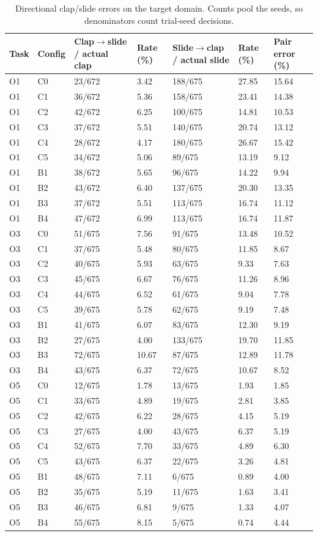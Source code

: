\begin{table}[t]
\centering
\small
\caption{Directional clap/slide errors on the target domain. Counts pool the seeds, so denominators count trial-seed decisions.}
\label{tab:T8_clap_slide}
\begin{tabular}{lllllll}
\hline
Task & Config & Clap$\rightarrow$slide / actual clap & Rate (\%) & Slide$\rightarrow$clap / actual slide & Rate (\%)  & Pair error (\%) \\
\hline
O1 & C0 & 23/672 & 3.42 & 188/675 & 27.85 & 15.64 \\
O1 & C1 & 36/672 & 5.36 & 158/675 & 23.41 & 14.38 \\
O1 & C2 & 42/672 & 6.25 & 100/675 & 14.81 & 10.53 \\
O1 & C3 & 37/672 & 5.51 & 140/675 & 20.74 & 13.12 \\
O1 & C4 & 28/672 & 4.17 & 180/675 & 26.67 & 15.42 \\
O1 & C5 & 34/672 & 5.06 & 89/675 & 13.19 & 9.12 \\
O1 & B1 & 38/672 & 5.65 & 96/675 & 14.22 & 9.94 \\
O1 & B2 & 43/672 & 6.40 & 137/675 & 20.30 & 13.35 \\
O1 & B3 & 37/672 & 5.51 & 113/675 & 16.74 & 11.12 \\
O1 & B4 & 47/672 & 6.99 & 113/675 & 16.74 & 11.87 \\
O3 & C0 & 51/675 & 7.56 & 91/675 & 13.48 & 10.52 \\
O3 & C1 & 37/675 & 5.48 & 80/675 & 11.85 & 8.67 \\
O3 & C2 & 40/675 & 5.93 & 63/675 & 9.33 & 7.63 \\
O3 & C3 & 45/675 & 6.67 & 76/675 & 11.26 & 8.96 \\
O3 & C4 & 44/675 & 6.52 & 61/675 & 9.04 & 7.78 \\
O3 & C5 & 39/675 & 5.78 & 62/675 & 9.19 & 7.48 \\
O3 & B1 & 41/675 & 6.07 & 83/675 & 12.30 & 9.19 \\
O3 & B2 & 27/675 & 4.00 & 133/675 & 19.70 & 11.85 \\
O3 & B3 & 72/675 & 10.67 & 87/675 & 12.89 & 11.78 \\
O3 & B4 & 43/675 & 6.37 & 72/675 & 10.67 & 8.52 \\
O5 & C0 & 12/675 & 1.78 & 13/675 & 1.93 & 1.85 \\
O5 & C1 & 33/675 & 4.89 & 19/675 & 2.81 & 3.85 \\
O5 & C2 & 42/675 & 6.22 & 28/675 & 4.15 & 5.19 \\
O5 & C3 & 27/675 & 4.00 & 43/675 & 6.37 & 5.19 \\
O5 & C4 & 52/675 & 7.70 & 33/675 & 4.89 & 6.30 \\
O5 & C5 & 43/675 & 6.37 & 22/675 & 3.26 & 4.81 \\
O5 & B1 & 48/675 & 7.11 & 6/675 & 0.89 & 4.00 \\
O5 & B2 & 35/675 & 5.19 & 11/675 & 1.63 & 3.41 \\
O5 & B3 & 46/675 & 6.81 & 9/675 & 1.33 & 4.07 \\
O5 & B4 & 55/675 & 8.15 & 5/675 & 0.74 & 4.44 \\
\hline
\end{tabular}
\end{table}
